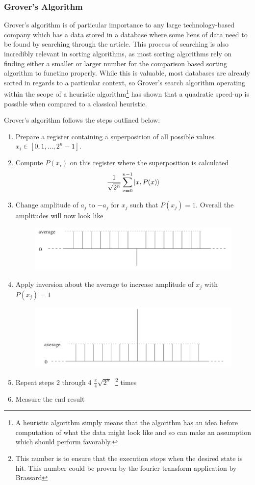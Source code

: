 \documentclass[12pt]{article}
\begin{document}
\subsubsection{Grover's Algorithm}
Grover's algorithm is of particular importance to any large technology-based company which has a data stored in a database where some liens of data need to be found by searching through the article. This process of searching is also incredibly relevant in sorting algorithms, as most sorting algorithms rely on finding either a smaller or larger number for the comparison based sorting algorithm to functino properly. While this is valuable, most databases are already sorted in regards to a particular context, so Grover's search algorithm operating within the scope of a heuristic algorithm\footnote{A heuristic algorithm simply means that the algorithm has an idea before computation of what the data might look like and so can make an assumption which should perform favorably.} has shown that a quadratic speed-up is possible when compared to a classical heuristic.\cite{non}\par
Grover's algorithm follows the steps outlined below:
\begin{enumerate}
\item Prepare a register containing a superposition of all possible values $x_i \in [0,1,...,2^n-1]$.
\item Compute $P(x_i)$ on this register where the superposition is calculated $$\frac{1}{\sqrt{2^n}}\sum^{n-1}_{x=0}\ket{x, P(x)}$$
\item Change amplitude of $a_j$ to $-a_j$ for $x_j$ such that $P(x_j) = 1$. Overall the amplitudes will now look like 
\begin{figure}[hb]
  \centering
  \includegraphics[width=.5\textwidth]{amplitude}
\end{figure}
\item Apply inversion about the average to increase amplitude of $x_j$ with $P(x_j)=1$
\begin{figure}[hb]
  \centering
  \includegraphics[width=.5\textwidth]{amplitude2}
\end{figure}
\item Repeat steps 2 through 4 $\frac{\pi}{4}\sqrt{2^n}\:$ \footnote{This number is to ensure that the execution stops when the desired state is hit. This number could be proven by the fourier transform application by Brassard} times
\item Measure the end result

\end{enumerate}
\end{document}

